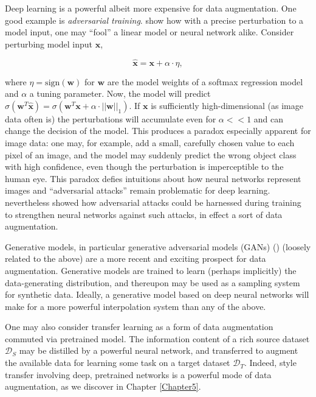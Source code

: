 Deep learning is a powerful albeit more expensive for data augmentation. One good example is \emph{adversarial training}. \cite{goodfellow2014explaining} show how with a precise perturbation to a model input, one may ``fool'' a linear model or neural network alike. Consider perturbing model input $\mathbf{x}$,

\begin{equation}
\hat{\mathbf{x}} = \mathbf{x} + \alpha\cdot\eta,
\end{equation}

where $\eta = \text{sign}(\mathbf{w})$ for $\mathbf{w}$ are the model weights of a softmax regression model and $\alpha$ a tuning parameter. Now, the model will predict $\sigma(\mathbf{w}^T\hat{\mathbf{x}}) = \sigma(\mathbf{w}^T\mathbf{x} + \alpha\cdot||\mathbf{w}||_1)$. If $\mathbf{x}$ is sufficiently high-dimensional (as image data often is) the perturbations will accumulate even for $\alpha << 1$ and can change the decision of the model. This produces a paradox especially apparent for image data: one may, for example, add a small, carefully chosen value to each pixel of an image, and the model may suddenly predict the wrong object class with high confidence, even though the perturbation is imperceptible to the human eye. This paradox defies intuitions about how neural networks represent images and ``adversarial attacks'' remain problematic for deep learning. \cite{goodfellow2014explaining} nevertheless showed how adversarial attacks could be harnessed during training to strengthen neural networks against such attacks, in effect a sort of data augmentation.

Generative models, in particular generative adversarial models (GANs) (\cite{goodfellow2014generative}) (loosely related to the above) are a more recent and exciting prospect for data augmentation. Generative models are trained to learn (perhaps implicitly) the data-generating distribution, and thereupon may be used as a sampling system for synthetic data. Ideally, a generative model based on deep neural networks will make for a more powerful interpolation system than any of the above.

One may also consider transfer learning as a form of data augmentation commuted via pretrained model. The information content of a rich source dataset $\mathcal{D}_S$ may be distilled by a powerful neural network, and transferred to augment the available data for learning some task on a target dataset $\mathcal{D}_T$. Indeed, style transfer involving deep, pretrained networks \cite{gatys2016image} is a powerful mode of data augmentation, as we discover in Chapter \ref{Chapter5}.

